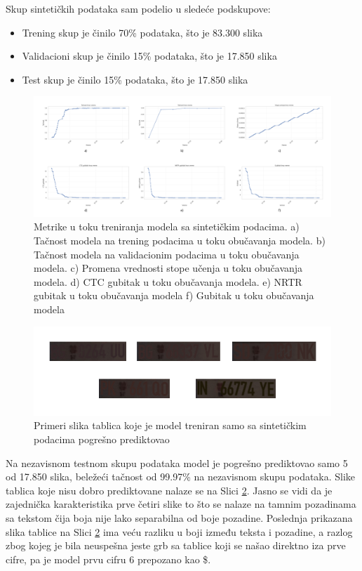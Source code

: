 \documentclass[a4paper,12pt]{article}
\begin{document}
	Skup sintetičkih podataka sam podelio u sledeće podskupove:
	\begin{itemize}
		\item Trening skup je činilo 70\% podataka, što je 83.300 slika
		\item Validacioni skup je činilo 15\% podataka, što je 17.850 slika
		\item Test skup je činilo 15\% podataka, što je 17.850 slika
	\end{itemize}

	\begin{figure}[H]
		\centering
		\includegraphics[width=\textwidth]{assets/synthetic-data-metrics.png}
		\caption{Metrike u toku treniranja modela sa sintetičkim podacima. a) Tačnost modela na trening podacima u toku obučavanja modela. b) Tačnost modela na validacionim podacima u toku obučavanja modela. c) Promena vrednosti stope učenja u toku obučavanja modela. d) CTC gubitak u toku obučavanja modela. e) NRTR gubitak u toku obučavanja modela f) Gubitak u toku obučavanja modela}
		\label{fig:synthetic-data-metrics}
	\end{figure}
	
	\begin{figure}[H]
		\centering
		\includegraphics[width=\textwidth]{assets/bad-predictions-synthetic-data-model.png}
		\caption{Primeri slika tablica koje je model treniran samo sa sintetičkim podacima pogrešno prediktovao}
		\label{fig:bad-predictions-synthetic-data-model}
	\end{figure}
	
	Na nezavisnom testnom skupu podataka model je pogrešno prediktovao samo 5 od 17.850 slika, beležeći tačnost od 99.97\% na nezavisnom skupu podataka. Slike tablica koje nisu dobro prediktovane nalaze se na Slici \ref{fig:bad-predictions-synthetic-data-model}. Jasno se vidi da je zajednička karakteristika prve četiri slike to što se nalaze na tamnim pozadinama sa tekstom čija boja nije lako separabilna od boje pozadine. Poslednja prikazana slika tablice na Slici \ref{fig:bad-predictions-synthetic-data-model} ima veću razliku u boji između teksta i pozadine, a razlog zbog kojeg je bila neuspešna jeste grb sa tablice koji se našao direktno iza prve cifre, pa je model prvu cifru 6 prepozano kao \$.
	
\end{document}
